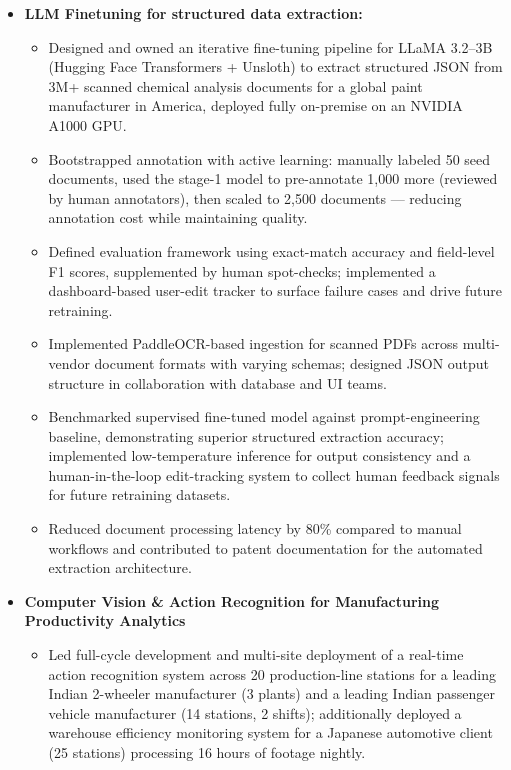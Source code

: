 \documentclass[a4paper,11pt]{article}
\begin{document}
    \begin{itemize}[leftmargin=*, itemsep = -1pt]
      \item {\textbf{LLM Finetuning for structured data extraction:}}
      \begin{itemize}[itemsep = -1pt]
        \item {Designed and owned an iterative fine-tuning pipeline for LLaMA 3.2--3B (Hugging Face Transformers + Unsloth) to extract structured JSON from 3M+ scanned chemical analysis documents for a global paint manufacturer in America, deployed fully on-premise on an NVIDIA A1000 GPU.}
        \item {Bootstrapped annotation with active learning: manually labeled 50 seed documents, used the stage-1 model to pre-annotate 1,000 more (reviewed by human annotators), then scaled to 2,500 documents — reducing annotation cost while maintaining quality.}
        \item {Defined evaluation framework using exact-match accuracy and field-level F1 scores, supplemented by human spot-checks; implemented a dashboard-based user-edit tracker to surface failure cases and drive future retraining.}
        \item {Implemented PaddleOCR-based ingestion for scanned PDFs across multi-vendor document formats with varying schemas; designed JSON output structure in collaboration with database and UI teams.}
        \item {Benchmarked supervised fine-tuned model against prompt-engineering baseline, demonstrating superior structured extraction accuracy; implemented low-temperature inference for output consistency and a human-in-the-loop edit-tracking system to collect human feedback signals for future retraining datasets.}
        \item {Reduced document processing latency by 80\% compared to manual workflows and contributed to patent documentation for the automated extraction architecture.}
      \end{itemize}\vspace{-1pt}
      \item {\textbf{Computer Vision \& Action Recognition for Manufacturing Productivity Analytics}}
        \begin{itemize}[itemsep = -1pt]
          \item {Led full-cycle development and multi-site deployment of a real-time action recognition system across 20 production-line stations for a leading Indian 2-wheeler manufacturer (3 plants) and a leading Indian passenger vehicle manufacturer (14 stations, 2 shifts); additionally deployed a warehouse efficiency monitoring system for a Japanese automotive client (25 stations) processing 16 hours of footage nightly.}

\end{itemize}
\end{itemize}
\end{document}
